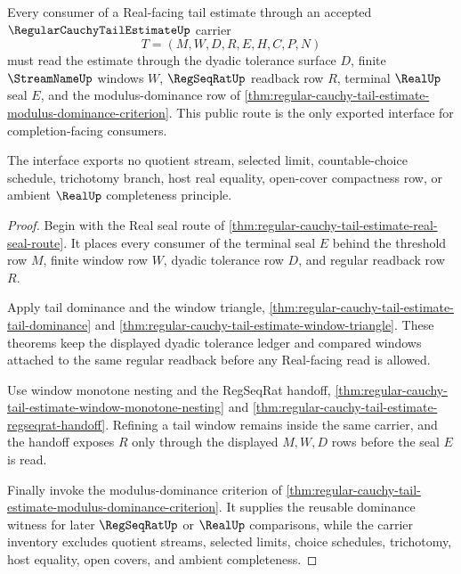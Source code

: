 \begin{theorem}
\label{thm:regular-cauchy-tail-estimate-public-interface}
Every consumer of a Real-facing tail estimate through an accepted $\RegularCauchyTailEstimateUp$ carrier
$$
T=(M,W,D,R,E,H,C,P,N)
$$
must read the estimate through the dyadic tolerance surface $D$, finite $\StreamNameUp$ windows $W$, $\RegSeqRatUp$ readback row $R$, terminal $\RealUp$ seal $E$, and the modulus-dominance row of \autoref{thm:regular-cauchy-tail-estimate-modulus-dominance-criterion}. This public route is the only exported interface for completion-facing consumers.

The interface exports no quotient stream, selected limit, countable-choice schedule, trichotomy branch, host real equality, open-cover compactness row, or ambient $\RealUp$ completeness principle.
\end{theorem}
\begin{proof}
Begin with the Real seal route of \autoref{thm:regular-cauchy-tail-estimate-real-seal-route}. It places every consumer of the terminal seal $E$ behind the threshold row $M$, finite window row $W$, dyadic tolerance row $D$, and regular readback row $R$.

Apply tail dominance and the window triangle, \autoref{thm:regular-cauchy-tail-estimate-tail-dominance} and \autoref{thm:regular-cauchy-tail-estimate-window-triangle}. These theorems keep the displayed dyadic tolerance ledger and compared windows attached to the same regular readback before any Real-facing read is allowed.

Use window monotone nesting and the RegSeqRat handoff, \autoref{thm:regular-cauchy-tail-estimate-window-monotone-nesting} and \autoref{thm:regular-cauchy-tail-estimate-regseqrat-handoff}. Refining a tail window remains inside the same carrier, and the handoff exposes $R$ only through the displayed $M,W,D$ rows before the seal $E$ is read.

Finally invoke the modulus-dominance criterion of \autoref{thm:regular-cauchy-tail-estimate-modulus-dominance-criterion}. It supplies the reusable dominance witness for later $\RegSeqRatUp$ or $\RealUp$ comparisons, while the carrier inventory excludes quotient streams, selected limits, choice schedules, trichotomy, host equality, open covers, and ambient completeness.
\end{proof}

